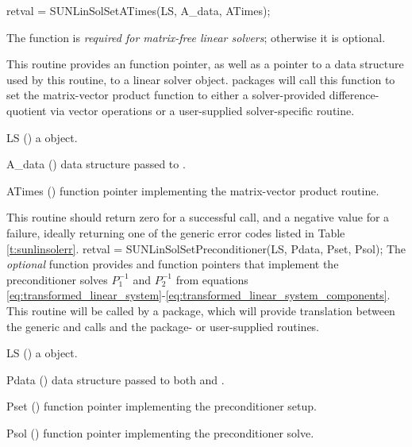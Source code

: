 {
  retval = SUNLinSolSetATimes(LS, A\_data, ATimes);
}
{
  The function  is \textit{required for matrix-free
  linear solvers}; otherwise it is optional.

  This routine provides an  function pointer, as well as
  a  pointer to a data structure used by this routine, to a
  linear solver object.  {\sundials} packages will call this function
  to set the matrix-vector product function to either a
  solver-provided difference-quotient via vector operations or a
  user-supplied solver-specific routine.

}
{
  \begin{args}[ATimes]
  \item[LS] ()
    a {\sunlinsol} object.
  \item[A\_data] ()
    data structure passed to .
  \item[ATimes] ()
    function pointer implementing the matrix-vector product routine.
  \end{args}
}
{
  This routine should return zero for a successful call, and a
  negative value for a failure, ideally returning one of the generic
  error codes listed in Table \ref{t:sunlinsolerr}.
}
{}
{
  retval = SUNLinSolSetPreconditioner(LS, Pdata, Pset, Psol);
}
{
  The \emph{optional} function 
  provides  and  function pointers that
  implement the preconditioner solves $P_1^{-1}$ and $P_2^{-1}$ from
  equations
  \eqref{eq:transformed_linear_system}-\eqref{eq:transformed_linear_system_components}.
  This routine will be called by a {\sundials} package, which will
  provide translation between the generic  and 
  calls and the package- or user-supplied routines.
}
{
  \begin{args}[Pdata]
  \item[LS] ()
    a {\sunlinsol} object.
  \item[Pdata] ()
    data structure passed to both  and .
  \item[Pset] ()
    function pointer implementing the preconditioner setup.
  \item[Psol] ()
    function pointer implementing the preconditioner solve.
  \end{args}
}
